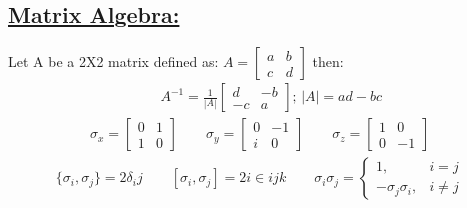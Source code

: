 \documentclass[a4paper,12pt]{article}
\begin{document}
\subsection*{\underline{Matrix Algebra:}}
Let A be a 2X2 matrix defined as:
$A = \begin{bmatrix}
        a & b \\
        c & d
    \end{bmatrix}$ then:
\begin{align}
     &  & A^{-1}=\frac{1}{|A|}
    \begin{bmatrix}
        d  & -b \\
        -c & a
    \end{bmatrix};\, |A| = ad-bc
\end{align}
\begin{align}
    \sigma_x = \begin{bmatrix}
        0 & 1 \\
        1 & 0
    \end{bmatrix} \qquad
    \sigma_y = \begin{bmatrix}
        0 & -1 \\
        i & 0
    \end{bmatrix} \qquad
    \sigma_z = \begin{bmatrix}
        1 & 0  \\
        0 & -1
    \end{bmatrix}
\end{align}
\begin{align}
    \{ \sigma_i, \sigma_j \} = 2 \delta_ij \qquad
    [\sigma_i, \sigma_j] = 2i \in ijk \qquad
    \sigma_i \sigma_j = \begin{cases}
        1 ,                   & i=j      \\
        - \sigma_j \sigma_i , & i \neq j
    \end{cases}
\end{align}
\end{document}
